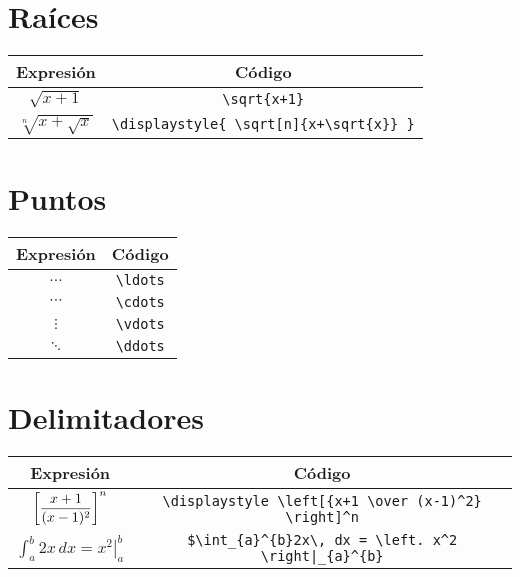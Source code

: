 \documentclass[a4,10pt]{aleph-notas}
\theoremstyle{definition}
\theoremstyle{plain}
\begin{document}
\section{Raíces}

\begin{center}
    \begin{tabular}{|c|c|}
        \hline
        Expresión & Código  \\ \hline
        $\sqrt{x+1}$ & \verb"\sqrt{x+1}" \\ \hline
        $\displaystyle{ \sqrt[n]{x+\sqrt{x}} }$ & \verb"\displaystyle{ \sqrt[n]{x+\sqrt{x}} }" \\ \hline
    \end{tabular}
\end{center}

\section{Puntos}
    
\begin{center}
\begin{tabular}{|c|c|}
    \hline
    Expresión & Código  \\ \hline
    $\ldots$ & \verb"\ldots" \\ \hline
    $\cdots$ & \verb"\cdots" \\ \hline
    $\vdots$ & \verb"\vdots" \\ \hline
    $\ddots$ & \verb"\ddots" \\ \hline
\end{tabular}
\end{center}

\section{Delimitadores}

\begin{center}
\begin{tabular}{|c|c|}
    \hline
    Expresión & Código  \\ \hline
    $\displaystyle \left[{x+1 \over (x-1)^2} \right]^n$ & \verb"\displaystyle \left[{x+1 \over (x-1)^2} \right]^n" \\ \hline
    $\int_{a}^{b}2x\, dx = \left. x^2 \right|_{a}^{b}$ & \verb"$\int_{a}^{b}2x\, dx = \left. x^2 \right|_{a}^{b}" \\ \hline
\end{tabular}
\end{center}
\end{document}
